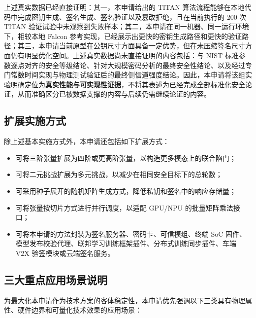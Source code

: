 \documentclass[12pt,a4paper]{article}
\begin{document}
上述真实数据已经直接证明：其一，本申请给出的 TITAN 算法流程能够在本地代码中完成密钥生成、签名生成、签名验证以及篡改拒绝，且在当前执行的 200 次 TITAN 验证试验中未观察到失败样本；其二，本申请在同一机器、同一运行环境下，相较本地 Falcon 参考实现，已经展示出更快的密钥生成路径和更快的验证路径；其三，本申请当前原型在公钥尺寸方面具备一定优势，但在未压缩签名尺寸方面仍有明显优化空间。上述真实数据尚未直接证明的内容包括：与 NIST 标准参数逐点对齐的安全等级结论、针对大规模密码分析的最终安全性结论、以及经过专门常数时间实现与物理测试验证后的最终侧信道强度结论。因此，本申请将该组实验明确定位为\textbf{真实性能与可实现性证据}，不将其表述为已经完成全部标准化安全论证，从而准确区分已被数据支撑的内容与后续仍需继续论证的内容。

\subsection{扩展实施方式}

除上述基本实施方式外，本申请还包括如下扩展方式：

\begin{itemize}
    \item 可将三阶张量扩展为四阶或更高阶张量，以构造更多模态上的联合陷门；
    \item 可将二元挑战扩展为多元挑战，以减少在相同安全目标下的总轮数；
    \item 可采用种子展开的随机矩阵生成方式，降低私钥和签名中的响应存储量；
    \item 可将张量按切片方式进行并行调度，以适配 GPU/NPU 的批量矩阵乘法接口；
    \item 可将本申请的方法封装为签名服务器、密码卡、可信模组、终端 SoC 固件、模型发布校验代理、联邦学习训练框架插件、分布式训练同步插件、车端 V2X 验签模块或云端签名服务。
\end{itemize}

\subsection{三大重点应用场景说明}

为最大化本申请作为技术方案的客体稳定性，本申请优先强调以下三类具有物理属性、硬件边界和可量化技术效果的应用场景：
\end{document}
